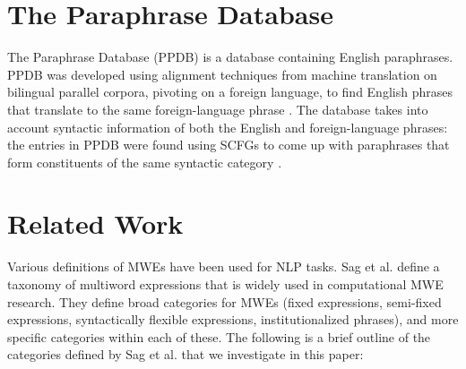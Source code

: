 \documentclass[11pt]{article}
\begin{document}
\section{The Paraphrase Database}

The Paraphrase Database (PPDB) is a database containing English paraphrases. PPDB was developed using alignment techniques from machine translation on bilingual parallel corpora, pivoting on a foreign language, to find English phrases that translate to the same foreign-language phrase . The database takes into account syntactic information of both the English and foreign-language phrases: the entries in PPDB were found using SCFGs to come up with paraphrases that form constituents of the same syntactic category \cite{ganitkevitch-EtAl:2011:EMNLP,ganitkevitch-vandurme-callisonburch:2013:NAACL-HLT}.

\section{Related Work}

Various definitions of MWEs have been used for NLP tasks. Sag et al. define a taxonomy of multiword expressions that is widely used in computational MWE research. They define broad categories for MWEs (fixed expressions, semi-fixed expressions, syntactically flexible expressions, institutionalized phrases), and more specific categories within each of these. The following is a brief outline of the categories defined by Sag et al. that we investigate in this paper:
\end{document}
